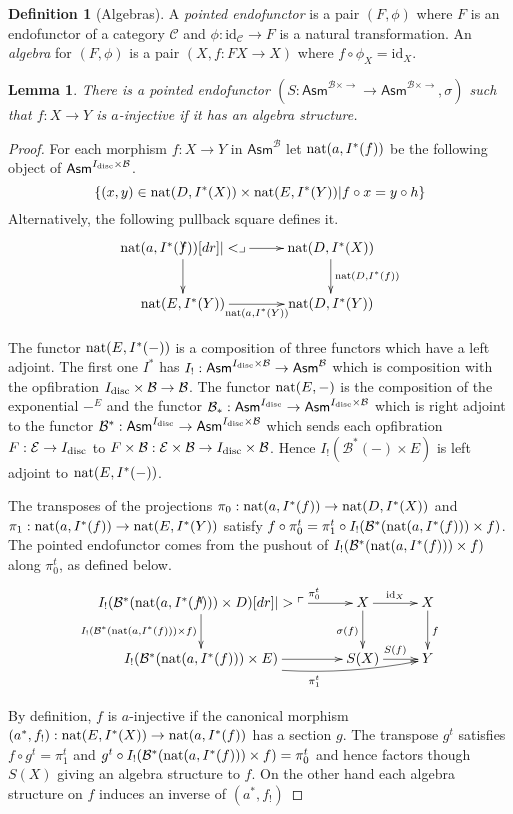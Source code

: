 \documentclass{amsart}
\theoremstyle{plain}
\newtheorem{lemma}[theorem]{Lemma}
\theoremstyle{definition}
\newtheorem{defin}[theorem]{Definition}
\newcommand\cat\mathcal
\newcommand\set[1]{\left\{#1\right\}}
\newcommand\id{\mathrm{id}}
\newcommand\ri{^*}
\newcommand\Asm{\mathsf{Asm}}
\begin{document}
\begin{defin}[Algebras] A \emph{pointed endofunctor} is a pair $(F,\phi)$ where $F$ is an endofunctor of a category $\cat C$ and $\phi:\id_{\cat C}\to F$ is a natural transformation. An \emph{algebra} for $(F,\phi)$ is a pair $(X,f:FX\to X)$ where $f\circ \phi_X = \id_X$. \end{defin}

\begin{lemma} There is a pointed endofunctor $(S:\Asm^{\cat B\times \to}\to\Asm^{\cat B\times \to}, \sigma)$ such that $f:X\to Y$ is $a$-injective if it has an algebra structure. \end{lemma}%

\begin{proof}
For each morphism $f:X\to Y$ in $\Asm^{\cat B}$ let $\nat(a,I\ri (f))$ be the following object of $\Asm^{I\disc\times \cat B}$.
\[ \set{(x,y)\in \nat(D,I\ri(X))\times \nat(E,I\ri(Y))| f\circ x = y\circ h } \]
Alternatively, the following pullback square defines it. 
\[\xymatrix{
\nat(a,I\ri(f)) \ar[r]\ar[d]\pb & \nat(D,I\ri(X)) \ar[d]^{\nat(D,I\ri(f))}\\
\nat(E,I\ri(Y)) \ar[r]_{\nat(a,I\ri(Y))} & \nat(D,I\ri(Y))
}\]

The functor $\mathrm{nat}(E,I^*(-))$ is a composition of three functors which have a left adjoint. The first one $I^*$ has $I_!:\Asm^{I\disc\times \cat B}\to \Asm^{\cat B}$ which is composition with the opfibration $I\disc\times \cat B\to \cat B$. The functor $\mathrm{nat}(E,-)$ is the composition of the exponential $-^E$ and the functor $\cat B_*:\Asm^{I\disc}\to\Asm^{I\disc\times \cat B}$ which is right adjoint to the functor $\cat B\ri:\Asm^{I\disc}\to\Asm^{I\disc\times \cat B}$ which sends each opfibration $F:\cat E\to I\disc$ to $F\times\cat B:\cat E\times\cat B\to I\disc\times\cat B$. Hence $I_!(\cat B^*(-)\times E)$ is left adjoint to $\mathrm{nat}(E,I^*(-))$.

The transposes of the projections $\pi_0: \nat(a,I\ri (f))\to \nat(D,I\ri(X))$ and $\pi_1:\nat(a,I\ri (f))\to \nat(E,I\ri(Y))$ satisfy $f\circ \pi_0^t = \pi_1^t\circ I_!(\cat B^*(\nat(a,I\ri (f)))\times f)$. The pointed endofunctor comes from the pushout of $I_!(\cat B^*(\nat(a,I\ri (f)))\times f)$ along $\pi_0^t$, as defined below.
\[ \xymatrix{
I_!(\cat B^*(\nat(a,I\ri (f)))\times D) \ar[r]^(.7){\pi_0^t} \ar[d]_{I_!(\cat B^*(\nat(a,I\ri (f)))\times f)}\po &
X \ar[r]^{\id_X}\ar[d]_{\sigma(f)} & X \ar[d]^f \\
I_!(\cat B^*(\nat(a,I\ri (f)))\times E) \ar[r] \ar@/_2ex/[rr]_{\pi_1^t} & S(X) \ar[r]^{S(f)} &  Y 
}\]

By definition, $f$ is $a$-injective if the canonical morphism $(a^*,f_!):\nat(E,I\ri(X))\to \nat(a,I\ri(f))$ has a section $g$. The transpose $g^t$ satisfies $f\circ g^t = \pi_1^t$ and $g^t\circ I_!(\cat B^*(\nat(a,I\ri (f)))\times f) = \pi_0^t$ and hence factors though $S(X)$ giving an algebra structure to $f$. On the other hand each algebra structure on $f$ induces an inverse of $(a^*,f_!)$ 
\end{proof}
\end{document}
